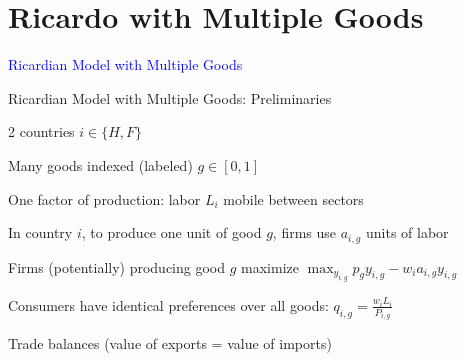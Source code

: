 \documentclass[notes,11pt, aspectratio=169, xcolor=table]{beamer}
\newcommand{\blue}[1]{\textcolor{blue}{#1}}
\newenvironment{wideitemize}{\itemize\addtolength{\itemsep}{10pt}}{\enditemize}
\begin{document}
\section{Ricardo with Multiple Goods}

\begin{frame}
\addtocounter{framenumber}{-1}

\centering

\Huge{\blue{Ricardian Model with Multiple Goods}}
    
\end{frame}

\begin{frame}{Ricardian Model with Multiple Goods: Preliminaries}
\begin{wideitemize}
        \item 2 countries $i \in \{ H, F\}$
        \item Many goods indexed (labeled) $g \in [0,1]$
        \item One factor of production: labor $L_i$ mobile between sectors
        \item In country $i$, to produce one unit of good $g$, firms use $a_{i,g}$ units of labor
        \item Firms (potentially) producing good $g$ maximize $\max_{y_{i,g}} p_{g} y_{i,g} - w_i a_{i,g} y_{i,g}$
        \item Consumers have identical preferences over all goods: $q_{i,g} = \frac{w_iL_i}{P_{i,g}}$
        \item Trade balances (value of exports = value of imports)
        \end{wideitemize}
\end{frame}
\end{document}
